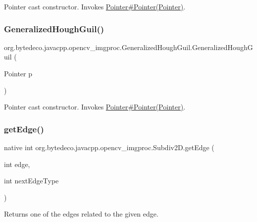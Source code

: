 Pointer cast constructor. Invokes \hyperlink{}{Pointer\#\+Pointer(\+Pointer)}. \mbox{\label{group__imgproc_ga357e428632b56d7aa6e17ea2b77713f5}} 
\subsubsection{\texorpdfstring{Generalized\+Hough\+Guil()}{GeneralizedHoughGuil()}}
{\footnotesize\ttfamily org.\+bytedeco.\+javacpp.\+opencv\+\_\+imgproc.\+Generalized\+Hough\+Guil.\+Generalized\+Hough\+Guil (\begin{DoxyParamCaption}\item[{Pointer}]{p }\end{DoxyParamCaption})\hspace{0.3cm}{\ttfamily [inline]}}

Pointer cast constructor. Invokes \hyperlink{}{Pointer\#\+Pointer(\+Pointer)}. \mbox{\label{group__imgproc_ga18f65f307c0cb3c2a8d5b851ab025d51}} 
\subsubsection{\texorpdfstring{get\+Edge()}{getEdge()}}
{\footnotesize\ttfamily native int org.\+bytedeco.\+javacpp.\+opencv\+\_\+imgproc.\+Subdiv2\+D.\+get\+Edge (\begin{DoxyParamCaption}\item[{int}]{edge,  }\item[{int}]{next\+Edge\+Type }\end{DoxyParamCaption})}



Returns one of the edges related to the given edge. 


